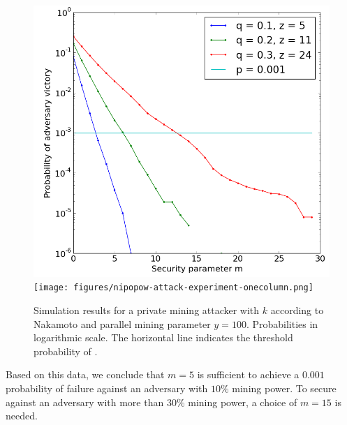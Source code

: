 \begin{figure}
    \caption{\label{fig.nipopow-attack-experiment}
        Simulation results for a private mining attacker with $k$ according to
        Nakamoto and parallel mining parameter $y = 100$. Probabilities in
        logarithmic scale. The horizontal line indicates the threshold
        probability of \cite{bitcoin}.
    }
    \centering
    \iftwocolumn
        \includegraphics[width=0.8 \columnwidth,keepaspectratio]{figures/nipopow-attack-experiment.png}
    \else
        \texttt{[image: figures/nipopow-attack-experiment-onecolumn.png]}
    \fi
\end{figure}

Based on this data, we conclude that $m = 5$ is sufficient to achieve a $0.001$
probability of failure against an adversary with $10\%$ mining power. To secure
against an adversary with more than $30\%$ mining power, a choice of $m = 15$ is
needed.
